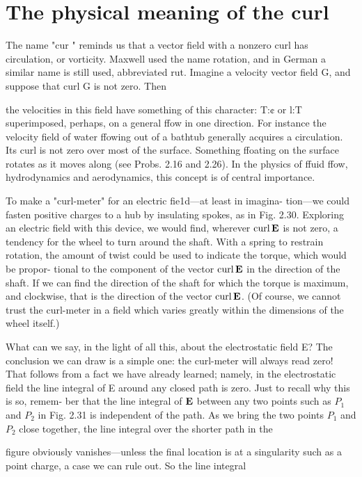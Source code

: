 {\section{The physical meaning of the curl}

The name "cur " reminds us that a vector field with a nonzero curl
has circulation, or vorticity. Maxwell used the name rotation, and
in German a similar name is still used, abbreviated rut. Imagine
a velocity vector field G, and suppose that curl G is not zero. Then

the velocities in this field have something of this character: T:¢ or
l:T superimposed, perhaps, on a general ffow in one direction. For
instance the velocity field of water ffowing out of a bathtub generally
acquires a circulation. Its curl is not zero over most of the surface.
Something ffoating on the surface rotates as it moves along (see
Probs. 2.16 and 2.26). In the physics of ffuid ffow, hydrodynamics
and aerodynamics, this concept is of central importance.

To make a "curl-meter" for an electric fie1d---at least in imagina-
tion---we could fasten positive charges to a hub by insulating spokes,
as in Fig. 2.30. Exploring an electric field with this device, we would
find, wherever $\operatorname{curl}\mathbf{E}$ is not zero, a tendency for the wheel to turn
around the shaft. With a spring to restrain rotation, the amount of
twist could be used to indicate the torque, which would be propor-
tional to the component of the vector $\operatorname{curl}\mathbf{E}$ in the direction of the
shaft. If we can find the direction of the shaft for which the torque
is maximum, and clockwise, that is the direction of the vector $\operatorname{curl}\mathbf{E}$.
(Of course, we cannot trust the curl-meter in a field which varies
greatly within the dimensions of the wheel itself.)

What can we say, in the light of all this, about the electrostatic
field E? The conclusion we can draw is a simple one: the curl-meter
will always read zero! That follows from a fact we have already
learned; namely, in the electrostatic field the line integral of E
around any closed path is zero. Just to recall why this is so, remem-
ber that the line integral of $\mathbf{E}$ between any two points such as $P_1$ and
$P_2$ in Fig. 2.31 is independent of the path. As we bring the two points
$P_1$ and $P_2$ close together, the line integral over the shorter path in the

figure obviously vanishes---unless the final location is at a singularity
such as a point charge, a case we can rule out. So the line integral

}
